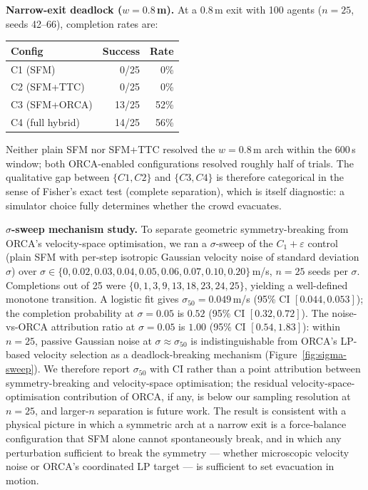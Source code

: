 \documentclass[a4paper,twoside]{article}
\begin{document}
\textbf{Narrow-exit deadlock ($w=0.8$\,m).}
At a 0.8\,m exit with 100 agents ($n=25$, seeds 42--66), completion rates are:
\begin{center}\scriptsize
\begin{tabular}{@{}lrr@{}}
\toprule
\textbf{Config} & \textbf{Success} & \textbf{Rate} \\
\midrule
C1 (SFM)         & 0/25  & 0\% \\
C2 (SFM+TTC)     & 0/25  & 0\% \\
C3 (SFM+ORCA)    & 13/25 & 52\% \\
C4 (full hybrid) & 14/25 & 56\% \\
\bottomrule
\end{tabular}
\end{center}
Neither plain SFM nor SFM+TTC resolved the $w=0.8$\,m arch within the 600\,s window; both ORCA-enabled configurations resolved roughly half of trials. The qualitative gap between $\{C1, C2\}$ and $\{C3, C4\}$ is therefore categorical in the sense of Fisher's exact test (complete separation), which is itself diagnostic: a simulator choice fully determines whether the crowd evacuates.

\textbf{$\sigma$-sweep mechanism study.}
To separate geometric symmetry-breaking from ORCA's velocity-space optimisation, we ran a $\sigma$-sweep of the $C_1{+}\varepsilon$ control (plain SFM with per-step isotropic Gaussian velocity noise of standard deviation $\sigma$) over $\sigma\!\in\!\{0,0.02,0.03,0.04,0.05,0.06,0.07,0.10,0.20\}$\,m/s, $n=25$ seeds per $\sigma$. Completions out of 25 were $\{0,1,3,9,13,18,23,24,25\}$, yielding a well-defined monotone transition. A logistic fit gives $\sigma_{50}=0.049$\,m/s (95\% CI $[0.044,0.053]$); the completion probability at $\sigma=0.05$ is $0.52$ (95\% CI $[0.32,0.72]$). The noise-vs-ORCA attribution ratio at $\sigma=0.05$ is $1.00$ (95\% CI $[0.54,1.83]$): within $n=25$, passive Gaussian noise at $\sigma\!\approx\!\sigma_{50}$ is indistinguishable from ORCA's LP-based velocity selection as a deadlock-breaking mechanism (Figure~\ref{fig:sigma-sweep}). We therefore report $\sigma_{50}$ with CI rather than a point attribution between symmetry-breaking and velocity-space optimisation; the residual velocity-space-optimisation contribution of ORCA, if any, is below our sampling resolution at $n=25$, and larger-$n$ separation is future work. The result is consistent with a physical picture in which a symmetric arch at a narrow exit is a force-balance configuration that SFM alone cannot spontaneously break, and in which any perturbation sufficient to break the symmetry --- whether microscopic velocity noise or ORCA's coordinated LP target --- is sufficient to set evacuation in motion.
\end{document}
